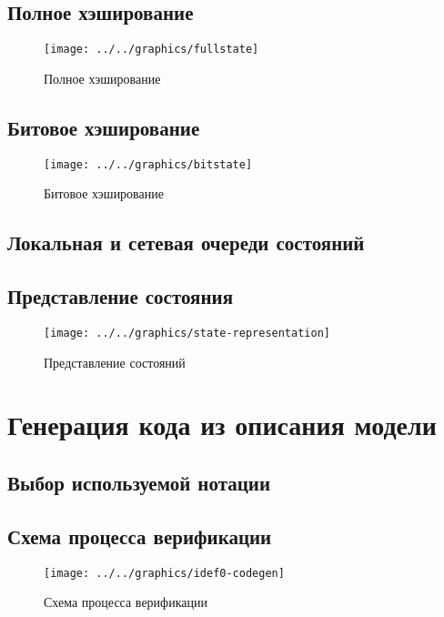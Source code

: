 \section{Полное хэширование}
\label{sec:fullstate}

\begin{figure}[ht]
  \centering
  \texttt{[image: ../../graphics/fullstate]}
  
  \caption{Полное хэширование}
  \label{fig:fullstate}
\end{figure}

\section{Битовое хэширование}
\label{sec:buthash}

\begin{figure}[ht]
  \centering
  \texttt{[image: ../../graphics/bitstate]}  
  \caption{Битовое хэширование}
  \label{fig:bitstate}
\end{figure}

\section{Локальная и сетевая очереди состояний}
\label{sec:local-network-queue}


\section{Представление состояния}
\label{sec:state-represent}

\begin{figure}[ht]
  \centering
  \texttt{[image: ../../graphics/state-representation]}  
  \caption{Представление состояний}
  \label{fig:state-repr}
\end{figure}

\chapter{Генерация кода из описания модели}
\label{cha:code-gen}

\section{Выбор используемой нотации}
\label{sec:notation-choice}

\section{Схема процесса верификации}
\label{sec:idef0-codegen}

\begin{figure}[ht]
  \centering
  \texttt{[image: ../../graphics/idef0-codegen]}  
  \caption{Схема процесса верификации}
\label{fig:idef0-codegen}
\end{figure}

